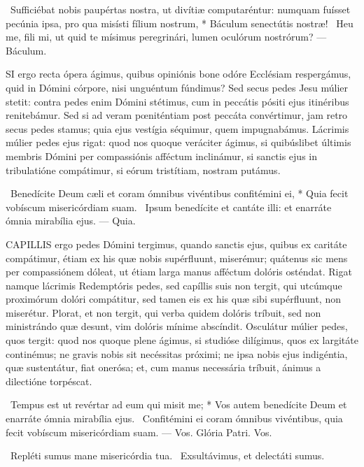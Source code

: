 \R\ Sufficiébat nobis paupértas nostra, ut divítiæ computaréntur: numquam fuísset pecúnia ipsa, pro qua misísti fílium nostrum, * Báculum senectútis nostræ! \V\ Heu me, fili mi, ut quid te mísimus peregrinári, lumen oculórum nostrórum? — Báculum.


\lettrine[lines=2]{S}{I} ergo recta ópera ágimus, quibus opiniónis bone odóre Ecclésiam respergámus, quid in Dómini córpore, nisi unguéntum fúndimus? Sed secus pedes Jesu múlier stetit: contra pedes enim Dómini stétimus, cum in peccátis pósiti ejus itinéribus renitebámur. Sed si ad veram pœniténtiam post peccáta convértimur, jam retro secus pedes stamus; quia ejus vestígia séquimur, quem impugnabámus. Lácrimis múlier pedes ejus rigat: quod nos quoque veráciter ágimus, si quibúslibet últimis membris Dómini per compassiónis afféctum inclinámur, si sanctis ejus in tribulatióne compátimur, si eórum tristítiam, nostram putámus.

\R\ Benedícite Deum cæli et coram ómnibus vivéntibus confitémini ei, * Quia fecit vobíscum misericórdiam suam. \V\ Ipsum benedícite et cantáte illi: et enarráte ómnia mirabília ejus. — Quia.


\lettrine[lines=2]{C}{APILLIS} ergo pedes Dómini tergimus, quando sanctis ejus, quibus ex caritáte compátimur, étiam ex his quæ nobis supérfluunt, miserémur; quátenus sic mens per compassiónem dóleat, ut étiam larga manus afféctum dolóris osténdat. Rigat namque lácrimis Redemptóris pedes, sed capíllis suis non tergit, qui utcúmque proximórum dolóri compátitur, sed tamen eis ex his quæ sibi supérfluunt, non miserétur. Plorat, et non tergit, qui verba quidem dolóris tríbuit, sed non ministrándo quæ desunt, vim dolóris mínime abscíndit. Osculátur múlier pedes, quos tergit: quod nos quoque plene ágimus, si studióse dilígimus, quos ex largitáte continémus; ne gravis nobis sit necéssitas próximi; ne ipsa nobis ejus indigéntia, quæ sustentátur, fiat onerósa; et, cum manus necessária tríbuit, ánimus a dilectióne torpéscat.

\R\ Tempus est ut revértar ad eum qui misit me; * Vos autem benedícite Deum et enarráte ómnia mirabília ejus. \V\ Confitémini ei coram ómnibus vivéntibus, quia fecit vobíscum misericórdiam suam. — Vos. Glória Patri. Vos.


\V\ Repléti sumus mane misericórdia tua. \R\ Exsultávimus, et delectáti sumus.

